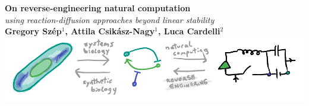 \documentclass[a0,portrait]{a0poster}
\begin{document}


\begin{minipage}[b]{0.99\linewidth}
	\begin{center}
		\veryHuge \color{DarkRed} \textbf{On reverse-engineering natural computation} \color{Black}\\ %
		\Huge\textit{using reaction-diffusion approaches beyond linear stability}\\[2.4cm] %
		\huge \textbf{Gregory Sz\'ep$^1$, Attila Csik\'asz-Nagy$^1$, Luca Cardelli$^2$}\\[0.5cm]
		\vspace{1cm}\includegraphics[width=70cm]{abstract}
	\end{center}
\end{minipage}

\addtobeamertemplate{}{}
{}
\end{document}

